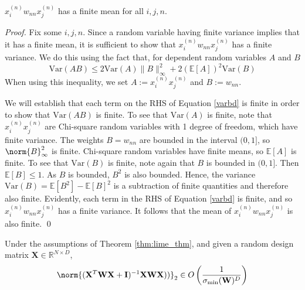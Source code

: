 \documentclass[mnsc,blindrev]{informs3}
\newcommand{\bX}{\mathbf{X}}
\newcommand{\bI}{\mathbf{I}}
\newcommand{\bW}{\mathbf{W}}
\begin{document}
   
\begin{lemma}
    \label{finitemean}
   $x_i^{(n)} w_{nn} x_j^{(n)}$ has a finite mean for all $i,j,n$. 
\end{lemma}
    \noindent \emph{Proof.} Fix some $i,j,n$. 
    Since a random variable having finite variance implies that it has a finite mean, it is sufficient to show that $x_i^{(n)} w_{nn} x_j^{(n)}$ has a finite variance. We do this using the fact that, for dependent random variables $A$ and $B$
    \begin{equation}
        \label{varbd}
        \mathrm{Var}(AB) \leq  2\mathrm{Var}(A)\lVert B\rVert_\infty^2+2(\mathbb E[A])^2\mathrm{Var}(B)
    \end{equation}
    When using this inequality, we set $A:=x_i^{(n)} x_j^{(n)}$ and $B:=w_{nn}$.

    We will establish that each term on the RHS of Equation \ref{varbd} is finite in order to show that $\mathrm{Var}(AB)$ is finite. To see that $\mathrm{Var}(A)$ is finite, note that $x_i^{(n)} x_j^{(n)}$ are Chi-square random variables with 1 degree of freedom, which have finite variance. The weights $B=w_{nn}$ are bounded in the interval $(0,1]$, so $\norm{B}_\infty^2$ is finite. Chi-square random variables have finite means, so $\mathds{E}[A]$ is finite. To see that $\mathrm{Var}(B)$ is finite, note again that $B$ is bounded in $(0,1]$. Then $\mathds{E}[B] \leq 1$. As $B$ is bounded, $B^2$ is also bounded. Hence, the variance $\mathrm{Var}(B) = \mathds{E}[B^2]-\mathds{E}[B]^2$ is a subtraction of finite quantities and therefore also finite. Evidently, each term in the RHS of Equation \ref{varbd} is finite, and so $x_i^{(n)} w_{nn} x_j^{(n)}$ has a finite variance. It follows that the mean of $x_i^{(n)} w_{nn} x_j^{(n)}$ is also finite.  \qed

    \begin{lemma}
        \label{norm_bd}
        Under the assumptions of  Theorem \ref{thm:lime_thm}, and given a random  design matrix $\bX \in \mathbb{R}^{N\times D}$,
        \[\norm{(\bX^T \bW \bX + \bI)^{-1}\bX \bW \bX))}_2 \in O\left(\frac{1}{\sigma_{\min}(\bW)^D}\right) \]
    \end{lemma}
    
\end{document}
